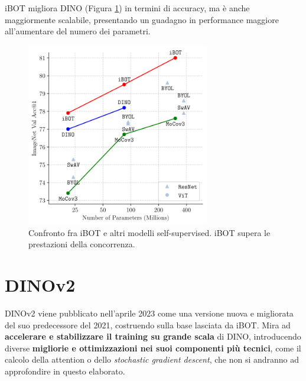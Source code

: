 iBOT migliora DINO (Figura \ref{fig:res_ibot}) in termini di accuracy, ma è anche maggiormente scalabile, presentando un guadagno in performance maggiore all'aumentare del numero dei parametri.
\vspace{1cm}
\begin{figure}[h]
    \centering
    \includegraphics[height=80mm]{Immagini/ssl/res_ibot.png}
    \caption{Confronto fra iBOT e altri modelli self-supervised. iBOT supera le prestazioni della concorrenza.}
    \label{fig:res_ibot}
\end{figure}

\clearpage
\section{DINOv2}
\label{dinov2}
DINOv2 \cite{dinov2} viene pubblicato nell'aprile 2023 come una versione nuova e migliorata del suo predecessore del 2021, costruendo sulla base lasciata da iBOT. Mira ad \textbf{accelerare e stabilizzare il training su grande scala} di DINO, introducendo diverse \textbf{migliorie e ottimizzazioni nei suoi componenti più tecnici}, come il calcolo della attention o dello \textit{stochastic gradient descent}, che non si andranno ad approfondire in questo elaborato.

